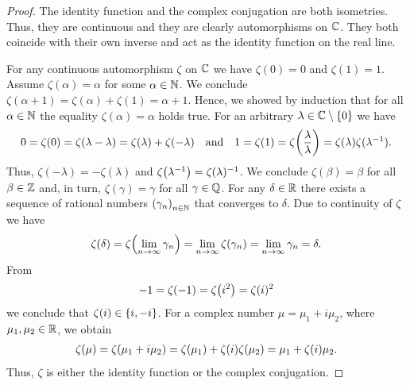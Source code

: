\begin{proof}
	The identity function and the complex conjugation are both isometries. Thus, they are continuous and they are clearly automorphisms on $\mathbb{C}$. They both coincide with their own inverse and act as the identity function on the real line.
	
	For any continuous automorphism $\zeta$ on $\mathbb{C}$ we have $\zeta(0) = 0$ and $\zeta(1) = 1$. Assume $\zeta(\alpha) = \alpha$ for some $\alpha \in \mathbb{N}$. We conclude $\zeta(\alpha + 1) = \zeta(\alpha) + \zeta(1) = \alpha + 1$. Hence, we showed by induction that for all $\alpha \in \mathbb{N}$ the equality $\zeta(\alpha) = \alpha$ holds true. For an arbitrary $\lambda \in \mathbb{C} \setminus \{0\}$ we have
	\begin{align*}
		0 = \zeta(0) = \zeta(\lambda - \lambda) = \zeta(\lambda) + \zeta(-\lambda) \quad \text{and} \quad 1 = \zeta(1) = \zeta{\left ( \frac{\lambda}{\lambda} \right )} = \zeta(\lambda) \zeta(\lambda^{-1}).
	\end{align*}
	Thus, $\zeta(- \lambda) = -\zeta(\lambda)$ and $\zeta{\left ( \lambda^{-1} \right )}= \zeta(\lambda)^{-1}$. We conclude $\zeta(\beta) = \beta$ for all $\beta \in \mathbb{Z}$ and, in turn, $\zeta(\gamma) = \gamma$ for all $\gamma \in \mathbb{Q}$. For any $\delta \in \mathbb{R}$ there exists a sequence of rational numbers ${\left ( \gamma_n \right )}_{n \in \mathbb{N}}$ that converges to $\delta$. Due to continuity of $\zeta$ we have 
	\begin{align*}
		\zeta(\delta) = \zeta{\left ( \lim_{n \to \infty} \gamma_n \right )} = \lim_{n \to \infty} \zeta(\gamma_n) = \lim_{n \to \infty} \gamma_n = \delta.
	\end{align*}
	From
	\begin{align*}
		-1 = \zeta(-1) = \zeta{\left ( i^2 \right )} = \zeta(i)^2
	\end{align*}
	we conclude that $\zeta(i) \in {\left \{ i, -i \right \}}$. For a complex number $\mu = \mu_1 + i \mu_2$, where $\mu_1, \mu_2 \in \mathbb{R}$, we obtain
	\begin{align*}
		\zeta(\mu) = \zeta{\left ( \mu_1 + i \mu_2 \right )} = \zeta{\left ( \mu_1 \right )} + \zeta(i) \zeta{\left ( \mu_2 \right )} = \mu_1 + \zeta(i) \mu_2.
	\end{align*}
	Thus, $\zeta$ is either the identity function or the complex conjugation.
\end{proof}


